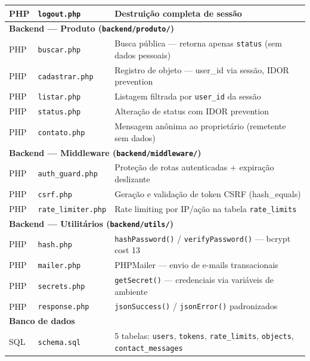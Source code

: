 \documentclass[12pt,a4paper]{article}
\begin{document}
\begin{table}[H]
\begin{tabularx}{\textwidth}{|l|l|X|}
    PHP & \texttt{logout.php}     & Destruição completa de sessão \\
    \hline
    \multicolumn{3}{|l|}{\textbf{Backend — Produto (\texttt{backend/produto/})}} \\
    \hline
    PHP & \texttt{buscar.php}    & Busca pública — retorna apenas \texttt{status} (sem dados pessoais) \\
    PHP & \texttt{cadastrar.php} & Registro de objeto — user\_id via sessão, IDOR prevention \\
    PHP & \texttt{listar.php}    & Listagem filtrada por \texttt{user\_id} da sessão \\
    PHP & \texttt{status.php}    & Alteração de status com IDOR prevention \\
    PHP & \texttt{contato.php}   & Mensagem anônima ao proprietário (remetente sem dados) \\
    \hline
    \multicolumn{3}{|l|}{\textbf{Backend — Middleware (\texttt{backend/middleware/})}} \\
    \hline
    PHP & \texttt{auth\_guard.php}    & Proteção de rotas autenticadas + expiração deslizante \\
    PHP & \texttt{csrf.php}           & Geração e validação de token CSRF (hash\_equals) \\
    PHP & \texttt{rate\_limiter.php}  & Rate limiting por IP/ação na tabela \texttt{rate\_limits} \\
    \hline
    \multicolumn{3}{|l|}{\textbf{Backend — Utilitários (\texttt{backend/utils/})}} \\
    \hline
    PHP & \texttt{hash.php}     & \texttt{hashPassword()} / \texttt{verifyPassword()} — bcrypt cost 13 \\
    PHP & \texttt{mailer.php}   & PHPMailer — envio de e-mails transacionais \\
    PHP & \texttt{secrets.php}  & \texttt{getSecret()} — credenciais via variáveis de ambiente \\
    PHP & \texttt{response.php} & \texttt{jsonSuccess()} / \texttt{jsonError()} padronizados \\
    \hline
    \multicolumn{3}{|l|}{\textbf{Banco de dados}} \\
    \hline
    SQL & \texttt{schema.sql} & 5 tabelas: \texttt{users}, \texttt{tokens}, \texttt{rate\_limits}, \texttt{objects}, \texttt{contact\_messages} \\
    \hline
  \end{tabularx}
\end{table}
\end{document}
